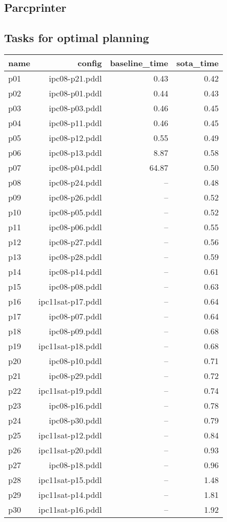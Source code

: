 \documentclass{article}
\begin{document}
                \newpage \subsection{Parcprinter}
                    \subsection*{Tasks for optimal planning}
                    
                            \begin{center}
                            \scriptsize
                            \begin{tabular}{@{}l|r|r|r@{}}
                            name & config & baseline\_time & sota\_time\\\midrule
                              p01& ipc08-p21.pddl&0.43&0.42\\
  p02& ipc08-p01.pddl&0.44&0.43\\
  p03& ipc08-p03.pddl&0.46&0.45\\
  p04& ipc08-p11.pddl&0.46&0.45\\
  p05& ipc08-p12.pddl&0.55&0.49\\
  p06& ipc08-p13.pddl&8.87&0.58\\
  p07& ipc08-p04.pddl&64.87&0.50\\
  p08& ipc08-p24.pddl&--&0.48\\
  p09& ipc08-p26.pddl&--&0.52\\
  p10& ipc08-p05.pddl&--&0.52\\
  p11& ipc08-p06.pddl&--&0.55\\
  p12& ipc08-p27.pddl&--&0.56\\
  p13& ipc08-p28.pddl&--&0.59\\
  p14& ipc08-p14.pddl&--&0.61\\
  p15& ipc08-p08.pddl&--&0.63\\
  p16& ipc11sat-p17.pddl&--&0.64\\
  p17& ipc08-p07.pddl&--&0.64\\
  p18& ipc08-p09.pddl&--&0.68\\
  p19& ipc11sat-p18.pddl&--&0.68\\
  p20& ipc08-p10.pddl&--&0.71\\
  p21& ipc08-p29.pddl&--&0.72\\
  p22& ipc11sat-p19.pddl&--&0.74\\
  p23& ipc08-p16.pddl&--&0.78\\
  p24& ipc08-p30.pddl&--&0.79\\
  p25& ipc11sat-p12.pddl&--&0.84\\
  p26& ipc11sat-p20.pddl&--&0.93\\
  p27& ipc08-p18.pddl&--&0.96\\
  p28& ipc11sat-p15.pddl&--&1.48\\
  p29& ipc11sat-p14.pddl&--&1.81\\
  p30& ipc11sat-p16.pddl&--&1.92
                            \end{tabular}
                            \end{center}
                    
\end{document}
